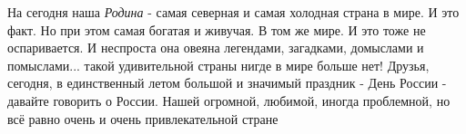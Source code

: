 На сегодня наша \emph{Родина} - самая северная и самая холодная страна в мире. И это
факт. Но при этом самая богатая и живучая. В том же мире. И это тоже не
оспаривается. И неспроста она овеяна легендами, загадками, домыслами и
помыслами... такой удивительной страны нигде в мире больше нет!  Друзья,
сегодня, в единственный летом большой и значимый праздник - День России -
давайте говорить о России. Нашей огромной, любимой, иногда проблемной, но всё
равно очень и очень привлекательной стране
